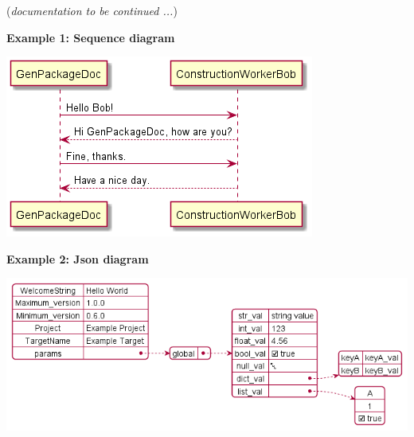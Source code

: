 %



%

(\textit{documentation to be continued ...})

\textbf{Example 1: Sequence diagram}

\includegraphics[scale=0.7]{./diagrams/SequenceDiagram.png}

\vspace{2ex}

\textbf{Example 2: Json diagram}

\includegraphics[scale=0.6]{./diagrams/JsonDiagram.png}

